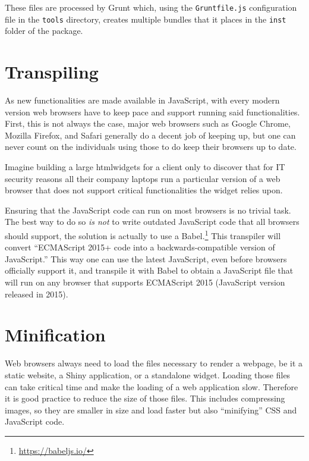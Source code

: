 \documentclass[10pt,]{krantz}
\renewcommand{\href}[2]{#2\footnote{\url{#1}}}
\begin{document}
These files are processed by Grunt which, using the \texttt{Gruntfile.js} configuration file in the \texttt{tools} directory, creates multiple bundles that it places in the \texttt{inst} folder of the package.

\hypertarget{webpack-browser}{%
\section{Transpiling}\label{webpack-browser}}

As new functionalities are made available in JavaScript, with every modern version web browsers have to keep pace and support running said functionalities. First, this is not always the case, major web browsers such as Google Chrome, Mozilla Firefox, and Safari generally do a decent job of keeping up, but one can never count on the individuals using those to do keep their browsers up to date.

Imagine building a large htmlwidgets for a client only to discover that for IT security reasons all their company laptops run a particular version of a web browser that does not support critical functionalities the widget relies upon.

Ensuring that the JavaScript code can run on most browsers is no trivial task. The best way to do so \emph{is not} to write outdated JavaScript code that all browsers should support, the solution is actually to use a \href{https://babeljs.io/}{Babel.} This transpiler will convert ``ECMAScript 2015+ code into a backwards-compatible version of JavaScript.'' This way one can use the latest JavaScript, even before browsers officially support it, and transpile it with Babel to obtain a JavaScript file that will run on any browser that supports ECMAScript 2015 (JavaScript version released in 2015).

\hypertarget{webpack-minification}{%
\section{Minification}\label{webpack-minification}}

Web browsers always need to load the files necessary to render a webpage, be it a static website, a Shiny application, or a standalone widget. Loading those files can take critical time and make the loading of a web application slow. Therefore it is good practice to reduce the size of those files. This includes compressing images, so they are smaller in size and load faster but also ``minifying'' CSS and JavaScript code.
\end{document}
